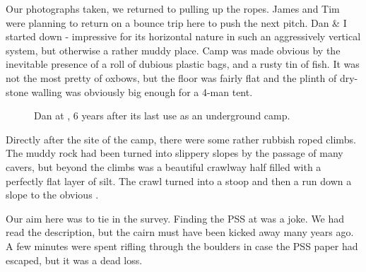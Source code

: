 Our photographs taken, we returned to  pulling up the
ropes. James and Tim were planning to return on a bounce trip here to
push the next pitch. Dan \& I started down  -
impressive for its horizontal nature in such an aggressively vertical
system, but otherwise a rather muddy place. Camp  was made
obvious by the inevitable presence of a roll of dubious plastic bags,
and a rusty tin of fish. It was not the most pretty of oxbows, but the
floor was fairly flat and the plinth of dry-stone walling was obviously
big enough for a 4-man tent.


\begin{figure}[t!]
\checkoddpage \ifoddpage \forcerectofloat \else \forceversofloat \fi
\centering
 \caption{Dan at \protect{}, 6 years after its last use as an underground camp. }
 \label{xray 2009}
\end{figure}




Directly after the site of the camp, there were some rather rubbish
roped climbs. The muddy rock had been turned into slippery slopes by the
passage of many cavers, but beyond the climbs was a beautiful crawlway
half filled with a perfectly flat layer of silt. The crawl turned into a
stoop and then a run down a slope to the obvious .

Our aim here was to tie in the survey. Finding the PSS at  was a joke. We had read the description, but the cairn must
have been kicked away many years ago. A few minutes were spent rifling
through the boulders in case the PSS paper had escaped, but it was a
dead loss.

